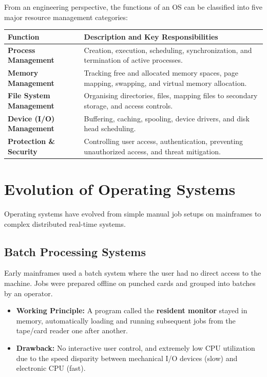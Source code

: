 \documentclass[12pt,a4paper]{article}
\begin{document}
From an engineering perspective, the functions of an OS can be classified into five major resource management categories:\par\noindent
\begin{tabularx}{\linewidth}{|B{3.2cm}|Y|}
\hline
\textbf{Function} & \textbf{\color{myteal}Description and Key Responsibilities} \\
\hline
\textbf{Process Management} & Creation, execution, scheduling, synchronization, and termination of active processes. \\
\hline
\textbf{Memory Management} & Tracking free and allocated memory spaces, page mapping, swapping, and virtual memory allocation. \\
\hline
\textbf{File System Management} & Organising directories, files, mapping files to secondary storage, and access controls. \\
\hline
\textbf{Device (I/O) Management} & Buffering, caching, spooling, device drivers, and disk head scheduling. \\
\hline
\textbf{Protection \& Security} & Controlling user access, authentication, preventing unauthorized access, and threat mitigation. \\
\hline
\end{tabularx}

\section{Evolution of Operating Systems}

Operating systems have evolved from simple manual job setups on mainframes to complex distributed real-time systems.

\subsection{Batch Processing Systems}
Early mainframes used a batch system where the user had no direct access to the machine. Jobs were prepared offline on punched cards and grouped into batches by an operator.
\begin{itemize}[leftmargin=*, itemsep=3pt]
  \item \textbf{Working Principle:} A program called the \textbf{resident monitor} stayed in memory, automatically loading and running subsequent jobs from the tape/card reader one after another.
  \item \textbf{Drawback:} No interactive user control, and extremely low CPU utilization due to the speed disparity between mechanical I/O devices (slow) and electronic CPU (fast).
\end{itemize}
\end{document}
